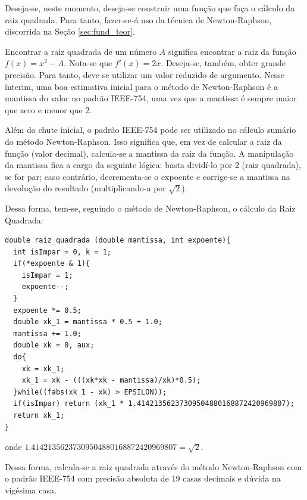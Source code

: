 	Deseja-se, neste momento, deseja-se construir uma função que faça o cálculo da raiz
	quadrada. Para tanto, fazer-se-á uso da técnica de Newton-Raphson, discorrida na Seção
	\ref{sec:fund_teor}.

	Encontrar a raiz quadrada de um número $A$ significa encontrar a raiz da função $f(x) = x^2 - A$.
	Nota-se que $f'(x) = 2x$. Deseja-se, também, obter grande precisão. Para tanto, deve-se utilizar
	um valor reduzido de argumento. Nesse ínterim, uma boa estimativa inicial para o método de Newton-Raphson
	é a mantissa do valor no padrão IEEE-754, uma vez que a mantissa é sempre maior que zero e menor que $2$.

	Além do chute inicial, o padrão IEEE-754 pode ser utilizado no cálculo sumário do método Newton-Raphson. Isso
	significa que, em vez de calcular a raiz da função (valor decimal), calcula-se a mantissa da raiz da função.
	A manipulação da mantissa fica a cargo da seguinte lógica: basta dividí-lo por $2$ (raiz quadrada), se for par;
	caso contrário, decrementa-se o expoente e corrige-se a mantissa na devolução do resultado (multiplicando-a por $\sqrt{2}$).

	Dessa forma, tem-se, seguindo o método de Newton-Raphson, o cálculo da Raiz Quadrada:
	\begin{Verbatim}[fontsize=\footnotesize]
double raiz_quadrada (double mantissa, int expoente){
  int isImpar = 0, k = 1;
  if(*expoente & 1){
    isImpar = 1;
    expoente--;
  }
  expoente *= 0.5;
  double xk_1 = mantissa * 0.5 + 1.0;
  mantissa += 1.0;
  double xk = 0, aux;
  do{
    xk = xk_1;
    xk_1 = xk - (((xk*xk - mantissa)/xk)*0.5);
  }while((fabs(xk_1 - xk) > EPSILON));
  if(isImpar) return (xk_1 * 1.41421356237309504880168872420969807);
  return xk_1;
}
	\end{Verbatim}
	onde $1.41421356237309504880168872420969807 = \sqrt{2}$.

	Dessa forma, calcula-se a raiz quadrada através do método Newton-Raphson com o padrão IEEE-754
	com precisão absoluta de 19 casas decimais e dúvida na vigésima casa.


